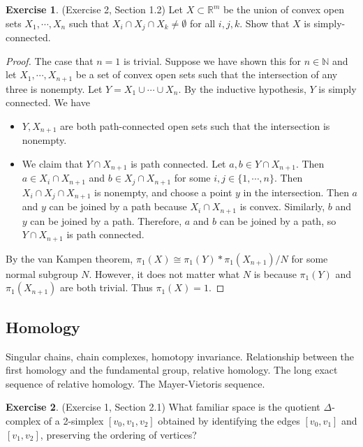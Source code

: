 \documentclass[12pt, psamsfonts]{amsart}
\theoremstyle{definition}
\newtheorem*{exer}{Exercise}
\theoremstyle{remark}
\numberwithin{equation}{section}
\begin{document}
\begin{exer}{(Exercise 2, Section 1.2)}
  Let $X \subset \mathbb{R}^m$ be the union of convex open sets $X_1, \cdots, X_n$ such that $X_i \cap X_j \cap X_k \ne \emptyset$ for all $i, j, k$.
  Show that $X$ is simply-connected.
\end{exer}

\begin{proof}
  The case that $n = 1$ is trivial.
  Suppose we have shown this for $n \in \mathbb{N}$ and let $X_1, \cdots, X_{n + 1}$ be a set of convex open sets such that the intersection of any three is nonempty.
  Let $Y = X_1 \cup \cdots \cup X_n$.
  By the inductive hypothesis, $Y$ is simply connected.
  We have
  \begin{itemize}
    \item
      $Y, X_{n + 1}$ are both path-connected open sets such that the intersection is nonempty.
    \item
      We claim that $Y \cap X_{n + 1}$ is path connected.
      Let $a, b \in Y \cap X_{n + 1}$.
      Then $a \in X_i \cap X_{n + 1}$ and $b \in X_j \cap X_{n + 1}$ for some $i, j \in \{ 1, \cdots, n \}$.
      Then $X_i \cap X_j \cap X_{n + 1}$ is nonempty, and choose a point $y$ in the intersection.
      Then $a$ and $y$ can be joined by a path because $X_i \cap X_{n + 1}$ is convex.
      Similarly, $b$ and $y$ can be joined by a path.
      Therefore, $a$ and $b$ can be joined by a path, so $Y \cap X_{n + 1}$ is path connected.
  \end{itemize}
  By the van Kampen theorem, $\pi_1(X) \cong \pi_1(Y) * \pi_1(X_{n + 1}) / N$ for some normal subgroup $N$.
  However, it does not matter what $N$ is because $\pi_1(Y)$ and $\pi_1(X_{n + 1})$ are both trivial.
  Thus $\pi_1(X) = 1$.
\end{proof}

\subsection{Homology}
Singular chains, chain complexes, homotopy invariance.
Relationship between the first homology and the fundamental group, relative homology.
The long exact sequence of relative homology.
The Mayer-Vietoris sequence.

\begin{exer}{(Exercise 1, Section 2.1)}
  What familiar space is the quotient $\Delta$-complex of a 2-simplex $[v_0, v_1, v_2]$ obtained by identifying the edges $[v_0, v_1]$ and $[v_1, v_2]$, preserving the ordering of vertices?
\end{exer}
\end{document}
